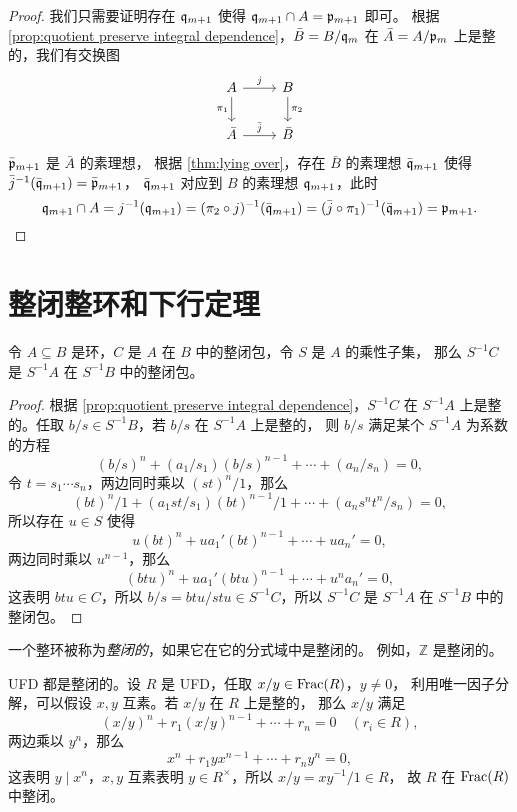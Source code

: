 \begin{proof}
  我们只需要证明存在 $\mathfrak{q}_{m+1}$
  使得 $\mathfrak{q}_{m+1}\cap A=\mathfrak{p}_{m+1}$ 即可。
  根据 \autoref{prop:quotient preserve integral dependence}，$\bar B=B/\mathfrak{q}_{m}$
  在 $\bar A=A/\mathfrak{p}_m$ 上是整的，我们有交换图
  \[
    \begin{tikzcd}
      A\arrow[r,"j"]\arrow[d,"\pi_1"'] & B\arrow[d,"\pi_2"] \\
      \bar A\arrow[r,"\bar j"] & \bar B
    \end{tikzcd}  
  \]
  $\bar{\mathfrak{p}}_{m+1}$ 是 $\bar A$ 的素理想，
  根据 \autoref{thm:lying over}，存在 $\bar B$ 的素理想 $\bar{\mathfrak{q}}_{m+1}$
  使得 $\bar j^{-1}(\bar{\mathfrak{q}}_{m+1})=\bar{\mathfrak{p}}_{m+1}$，
  $\bar{\mathfrak{q}}_{m+1}$ 对应到 $B$ 的素理想 $\mathfrak{q}_{m+1}$，此时
  \[
    \mathfrak{q}_{m+1}\cap A=j^{-1}(\mathfrak{q}_{m+1})
    =(\pi_2\circ j)^{-1}(\bar{\mathfrak{q}}_{m+1})=(\bar j\circ\pi_1)^{-1}(\bar{\mathfrak{q}}_{m+1})
    =\mathfrak{p}_{m+1}.\qedhere
  \]
\end{proof}

\section{整闭整环和下行定理}

\begin{proposition}\label{prop:integrally closed in fraction}
  令 $A\subseteq B$ 是环，$C$ 是 $A$ 在 $B$ 中的整闭包，令 $S$ 是 $A$ 的乘性子集，
  那么 $S^{-1}C$ 是 $S^{-1}A$ 在 $S^{-1}B$ 中的整闭包。
\end{proposition}
\begin{proof}
  根据 \autoref{prop:quotient preserve integral dependence}，$S^{-1}C$ 在 $S^{-1}A$ 
  上是整的。任取 $b/s\in S^{-1}B$，若 $b/s$ 在 $S^{-1}A$ 上是整的，
  则 $b/s$ 满足某个 $S^{-1}A$ 为系数的方程
  \[
    (b/s)^n+(a_1/s_1)(b/s)^{n-1}+\cdots+(a_n/s_n)=0,  
  \]
  令 $t=s_1\cdots s_n$，两边同时乘以 $(st)^n/1$，那么
  \[
    (bt)^n/1+(a_1st/s_1)(bt)^{n-1}/1+\cdots+(a_ns^nt^n/s_n)=0,
  \]
  所以存在 $u\in S$ 使得
  \[
    u(bt)^n+ua_1' (bt)^{n-1}+\cdots+ua_n'=0,
  \] 
  两边同时乘以 $u^{n-1}$，那么
  \[
    (btu)^n+ua_1'(btu)^{n-1}  +\cdots+u^na_n'=0,
  \]
  这表明 $btu\in C$，所以 $b/s=btu/stu\in S^{-1}C$，所以 $S^{-1}C$ 是 $S^{-1}A$ 在 $S^{-1}B$ 中的整闭包。
\end{proof}

一个整环被称为\emph{整闭的}，如果它在它的分式域中是整闭的。
例如，$\mathbb{Z}$ 是整闭的。

\begin{example}
  UFD 都是整闭的。设 $R$ 是 UFD，任取 $x/y\in \operatorname{Frac}(R)$，$y\neq 0$，
  利用唯一因子分解，可以假设 $x,y$ 互素。若 $x/y$ 在 $R$ 上是整的，
  那么 $x/y$ 满足
  \[
    (x/y)^n+r_1(x/y)^{n-1}+\cdots+r_n=0\quad (r_i\in R),
  \]
  两边乘以 $y^n$，那么
  \[
    x^n+r_1yx^{n-1}  +\cdots+r_ny^n=0,
  \]
  这表明 $y\mid x^n$，$x,y$ 互素表明 $y\in R^\times$，所以 $x/y=xy^{-1}/1\in R$，
  故 $R$ 在 $\operatorname{Frac}(R)$ 中整闭。
\end{example}

